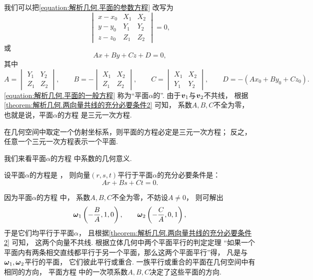 我们可以把\cref{equation:解析几何.平面的参数方程} 改写为
\begin{equation}
	\begin{vmatrix}
		x - x_0 & X_1 & X_2 \\
		y - y_0 & Y_1 & Y_2 \\
		z - z_0 & Z_1 & Z_2
	\end{vmatrix} = 0,
\end{equation}
或\begin{equation}\label{equation:解析几何.平面的一般方程}
	A x + B y + C z + D = 0,
\end{equation}
其中\begin{equation*}
	A = \begin{vmatrix}
		Y_1 & Y_2 \\
		Z_1 & Z_2
	\end{vmatrix},
	\qquad
	B = -\begin{vmatrix}
		X_1 & X_2 \\
		Z_1 & Z_2
	\end{vmatrix},
	\qquad
	C = \begin{vmatrix}
		X_1 & X_2 \\
		Y_1 & Y_2
	\end{vmatrix},
	\qquad
	D = - (A x_0 + B y_0 + C z_0).
\end{equation*}
\cref{equation:解析几何.平面的一般方程}
称为“平面\(\alpha\)的”.
由于\(\boldsymbol{v}_1\)与\(\boldsymbol{v}_2\)不共线，
根据\cref{theorem:解析几何.两向量共线的充分必要条件2} 可知，
系数\(A,B,C\)不全为零，
也就是说，平面\(\alpha\)的方程  是三元一次方程.

\begin{theorem}
在几何空间中取定一个仿射坐标系，则平面的方程必定是三元一次方程；
反之，任意一个三元一次方程表示一个平面.
\end{theorem}

我们来看平面\(\alpha\)的方程  中系数的几何意义.

\begin{theorem}
设平面\(\alpha\)的方程是 ，
则向量\((r,s,t)\)平行于平面\(\alpha\)的充分必要条件是：\begin{equation*}
	Ar+Bs+Ct = 0.
\end{equation*}
\end{theorem}

因为平面\(\alpha\)的方程  中，
系数\(A,B,C\)不全为零，不妨设\(A\neq0\)，
则可解出\begin{equation*}
	\boldsymbol{\omega}_1 \left( -\frac{B}{A},1,0 \right), \qquad
	\boldsymbol{\omega}_2 \left( -\frac{C}{A},0,1 \right),
\end{equation*}
于是它们均平行于平面\(\alpha\)，
且根据\cref{theorem:解析几何.两向量共线的充分必要条件2} 可知，
这两个向量不共线.
根据立体几何中两个平面平行的判定定理
“如果一个平面内有两条相交直线都平行于另一个平面，那么这两个平面平行”得，
凡是与\(\boldsymbol{\omega}_1,\boldsymbol{\omega}_2\)平行的平面，
它们彼此平行或重合.
一族平行或重合的平面在几何空间中有相同的方向，
平面方程  中的一次项系数\(A,B,C\)决定了这些平面的方向.


